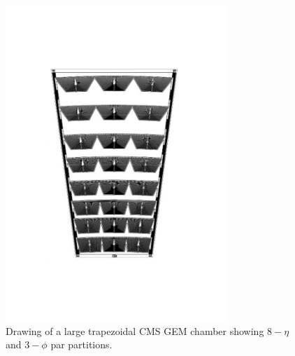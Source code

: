 \begin{figure}[!htbp]
    \begin{center}
        \includegraphics[angle=-90,width=0.75\textwidth]{figures/GEM/gemTrapezoidal.pdf}
        \caption{Drawing of a large trapezoidal CMS GEM chamber showing $8-\eta$ and $3-\phi$ par partitions.}
        \label{fig:gemTrapezoidal}
    \end{center}
\end{figure}

